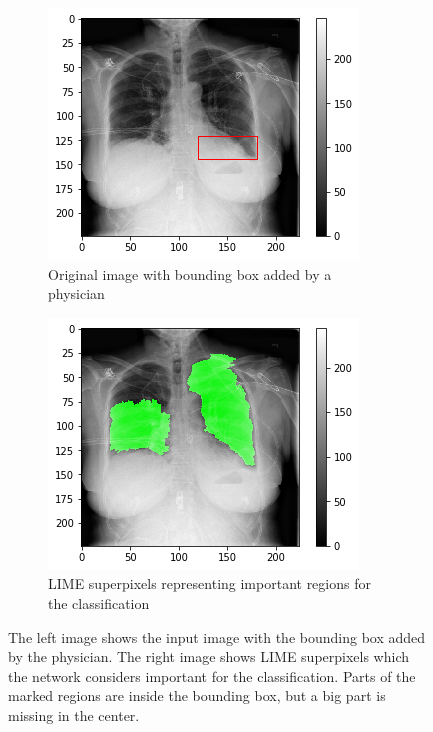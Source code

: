 \begin{figure}[H]
    \centering
    \begin{subfigure}[t]{.45\textwidth}
        \centering
        \includegraphics[width=\linewidth]{chapters/03_classification/images/rise1_bbox}
        \caption{Original image with bounding box added by a physician}
    \end{subfigure}\hspace{1cm}%
    \begin{subfigure}[t]{.45\textwidth}
        \centering
        \includegraphics[width=\linewidth]{chapters/03_classification/images/lime_2.png}
        \caption{LIME superpixels representing important regions for the classification}
    \end{subfigure}
    \caption{The left image shows the input image with the bounding box added by the physician. The right image shows LIME superpixels which the network considers important for the classification. Parts of the marked regions are inside the bounding box, but a big part is missing in the center.}
    \label{lime_example_2}
\end{figure}

